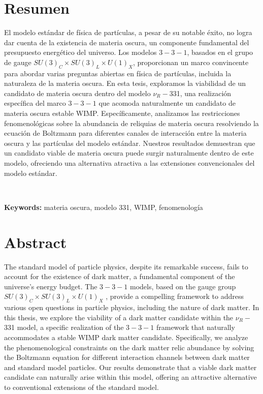 \documentclass[11pt,spanish]{report}
\begin{document}
\chapter*{Resumen}
El modelo estándar de física de partículas, a pesar de su notable éxito, no logra dar cuenta de la existencia de materia oscura, un componente fundamental del presupuesto energético del universo. Los modelos $3-3-1$, basados en el grupo de gauge $SU(3)_C \times SU(3)_L \times U(1)_X$, proporcionan un marco convincente para abordar varias preguntas abiertas en física de partículas, incluida la naturaleza de la materia oscura. En esta tesis, exploramos la viabilidad de un candidato de materia oscura dentro del modelo $\nu_R-$331, una realización específica del marco $3-3-1$ que acomoda naturalmente un candidato de materia oscura estable WIMP. Específicamente, analizamos las restricciones fenomenológicas sobre la abundancia de reliquias de materia oscura resolviendo la ecuación de Boltzmann para diferentes canales de interacción entre la materia oscura y las partículas del modelo estándar. Nuestros resultados demuestran que un candidato viable de materia oscura puede surgir naturalmente dentro de este modelo, ofreciendo una alternativa atractiva a las extensiones convencionales del modelo estándar.

\  \

\noindent
\textbf{Keywords:} materia oscura, modelo 331, WIMP, fenomenología


\chapter*{Abstract}
The standard model of particle physics, despite its remarkable success, fails to account for the existence of dark matter, a fundamental component of the universe's energy budget. The $3-3-1$ models, based on the gauge group 
$SU(3)_C \times SU(3)_L \times U(1)_X$ , provide a compelling framework to address various open questions in particle physics, including the nature of dark matter. In this thesis, we explore the viability of a dark matter candidate within the $\nu_R-$331 model, a specific realization of the $3-3-1$ framework that naturally accommodates a stable WIMP dark matter candidate. Specifically, we analyze the phenomenological constraints on the dark matter relic abundance by solving the Boltzmann equation for different interaction channels between dark matter and standard model particles. Our results demonstrate that a viable dark matter candidate can naturally arise within this model, offering an attractive alternative to conventional extensions of the standard model.
\end{document}
